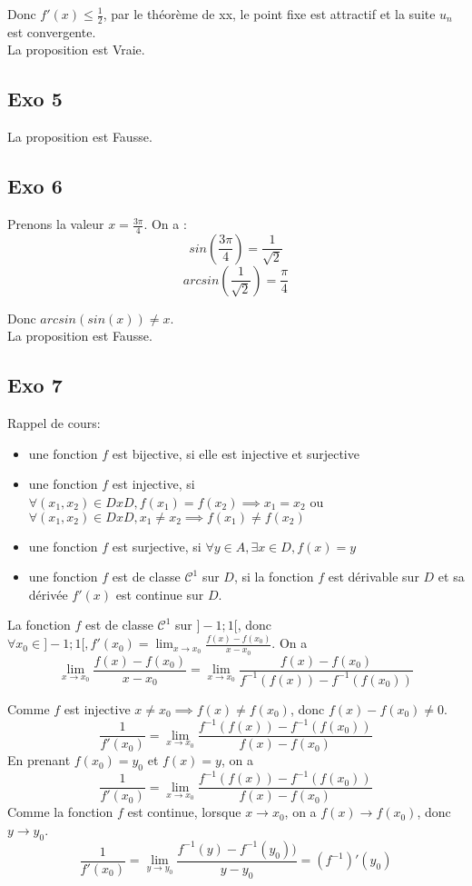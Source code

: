 \documentclass[]{book}
\theoremstyle{definition}
\begin{document}
Donc $f'(x) \leq \frac{1}{2}$, par le th\'eor\`eme de xx, le point fixe est attractif et la suite $u_n$ est convergente.\\

La proposition est Vraie.

\subsection*{Exo 5}



La proposition est Fausse.

\subsection*{Exo 6}

Prenons la valeur $x=\frac{3\pi}{4}$. On a :
$$sin(\frac{3\pi}{4}) = \frac{1}{\sqrt{2}}$$
$$arcsin(\frac{1}{\sqrt{2}}) = \frac{\pi}{4}$$

Donc $arcsin(sin(x)) \neq x$.\\

La proposition est Fausse.

\subsection*{Exo 7}
Rappel de cours:\\
\begin{itemize}
\item une fonction $f$ est bijective, si elle est injective et surjective
\item une fonction $f$ est injective, si $\forall (x_1, x_2) \in D x D, f(x_1) = f(x_2) \implies x_1 = x_2$ ou $\forall (x_1, x_2) \in D x D, x_1 \neq x_2 \implies f(x_1) \neq f(x_2)$
\item une fonction $f$ est surjective, si $\forall y \in A, \exists x \in D, f(x) = y$ 
\item une fonction $f$ est de classe $\mathcal{C}^1$ sur $D$, si la fonction $f$ est d\'erivable sur $D$ et sa d\'eriv\'ee $f'(x)$ est continue sur $D$.
\end{itemize}

La fonction $f$ est de classe $\mathcal{C}^1$ sur $]-1;1[$, donc $\forall x_0 \in ]-1;1[, f'(x_0) = \lim_{x \to x_0}\frac{f(x) - f(x_0)}{x-x_0}$.
On a 
$$\lim_{x \to x_0}\frac{f(x) - f(x_0)}{x-x_0} = \lim_{x \to x_0}\frac{f(x) - f(x_0)}{f^{-1}(f(x)) - f^{-1}(f(x_0))}$$

Comme $f$ est injective $x \neq x_0 \implies f(x) \neq f(x_0)$, donc $f(x)-f(x_0) \neq 0$.\\
$$\frac{1}{f'(x_0)} = \lim_{x \to x_0}\frac{f^{-1}(f(x)) - f^{-1}(f(x_0))}{f(x) - f(x_0)}$$
En prenant $f(x_0) = y_0$ et $f(x) = y$, on a 
$$\frac{1}{f'(x_0)} = \lim_{x \to x_0}\frac{f^{-1}(f(x)) - f^{-1}(f(x_0))}{f(x) - f(x_0)}$$
Comme la fonction $f$ est continue, lorsque $x \to x_0$, on a $f(x) \to f(x_0)$, donc $y \to y_0$.
$$\frac{1}{f'(x_0)} = \lim_{y \to y_0}\frac{f^{-1}(y) - f^{-1}(y_0))}{y - y_0} = (f^{-1})'(y_0)$$
\end{document}

